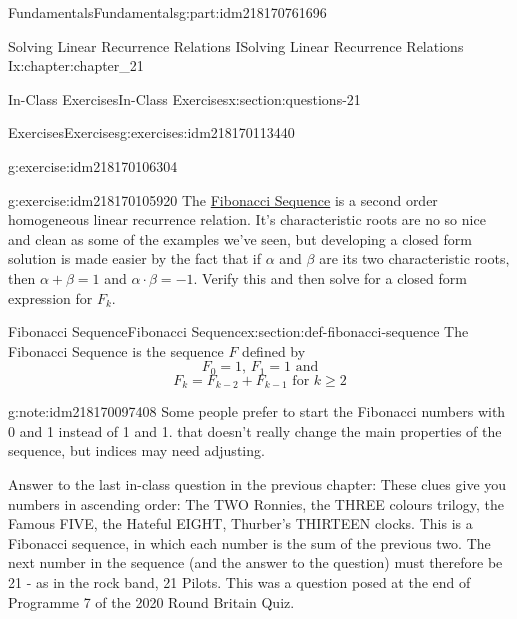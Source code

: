 \documentclass[oneside,10pt,]{book}
\numberwithin{equation}{section}
\begin{document}
\begin{partptx}{Fundamentals}{}{Fundamentals}{}{}{g:part:idm218170761696}
\begin{chapterptx}{Solving Linear Recurrence Relations I}{}{Solving Linear Recurrence Relations I}{}{}{x:chapter:chapter_21}
\begin{sectionptx}{In-Class Exercises}{}{In-Class Exercises}{}{}{x:section:questions-21}
\begin{exercises-subsection-numberless}{Exercises}{}{Exercises}{}{}{g:exercises:idm218170113440}
\begin{exercisegroup}
\begin{divisionexerciseeg}{3}{}{}{g:exercise:idm218170106304}
\end{divisionexerciseeg}%
\begin{divisionexerciseeg}{4}{}{}{g:exercise:idm218170105920}%
The \hyperref[x:section:def-fibonacci-sequence]{Fibonacci Sequence}  is a second order homogeneous linear recurrence relation. It's characteristic roots are no so nice and clean as some of the examples we've seen, but developing a closed form solution is made easier by the fact that if \(\alpha\) and \(\beta\) are its two characteristic roots, then \(\alpha + \beta = 1\) and \(\alpha \cdot \beta =-1\).  Verify this and then solve for a closed form expression for \(F_k\).%
\end{divisionexerciseeg}%
\end{exercisegroup}
\par\medskip\noindent
\end{exercises-subsection-numberless}
\end{sectionptx}
%
%
\typeout{************************************************}
\typeout{************************************************}
%
\begin{sectionptx}{Fibonacci Sequence}{}{Fibonacci Sequence}{}{}{x:section:def-fibonacci-sequence}
%
The Fibonacci Sequence is the sequence \(F\) defined by%
\begin{equation*}
F_0= 1 \textrm{, } F_1= 1\textrm{ and}
\end{equation*}
%
\begin{equation*}
F_k = F_{k-2} + F_{k-1} \textrm{ for }k\geq 2
\end{equation*}
%
\begin{note}{}{g:note:idm218170097408}%
Some people prefer to start the Fibonacci numbers with 0 and 1 instead of 1 and 1.  that doesn't really change the main properties of the sequence, but indices may need adjusting.%
\end{note}
Answer to the last in-class question in the previous chapter: These clues give you numbers in ascending order: The TWO Ronnies, the THREE colours trilogy, the Famous FIVE, the Hateful EIGHT, Thurber's THIRTEEN clocks. This is a Fibonacci sequence, in which each number is the sum of the previous two. The next number in the sequence (and the answer to the question) must therefore be 21 - as in the rock band, 21 Pilots. This was a question posed at the end of Programme 7 of the 2020 Round Britain Quiz.%
\end{sectionptx}
\end{chapterptx}

\end{partptx}
\end{document}
